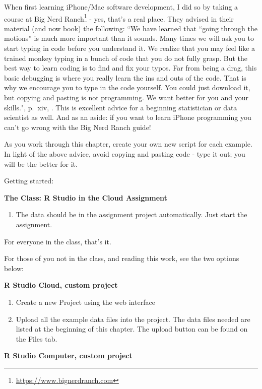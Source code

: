 \documentclass[
]{krantz}
\providecommand{\tightlist}{%
  \setlength{\itemsep}{0pt}\setlength{\parskip}{0pt}}
\renewcommand{\href}[2]{#2\footnote{\url{#1}}}
\begin{document}
When first learning iPhone/Mac software development, I did so by taking a course at \href{https://www.bignerdranch.com}{Big Nerd Ranch} - yes, that's a real place. They advised in their material (and now book) the following: ``We have learned that ``going through the motions'' is much more important than it sounds. Many times we will ask you to start typing in code before you understand it. We realize that you may feel like a trained monkey typing in a bunch of code that you do not fully grasp. But the best way to learn coding is to find and fix your typos. Far from being a drag, this basic debugging is where you really learn the ins and outs of the code. That is why we encourage you to type in the code yourself. You could just download it, but copying and pasting is not programming. We want better for you and your skills.", p.~xiv, \citep{keur2020}. This is excellent advice for a beginning statistician or data scientist as well. And as an aside: if you want to learn iPhone programming you can't go wrong with the Big Nerd Ranch guide!

As you work through this chapter, create your own new script for each example. In light of the above advice, avoid copying and pasting code - type it out; you will be the better for it.

Getting started:

\textbf{The Class: R Studio in the Cloud Assignment}

\begin{enumerate}
\def\labelenumi{\arabic{enumi}.}
\tightlist
\item
  The data should be in the assignment project automatically. Just start the assignment.
\end{enumerate}

For everyone in the class, that's it.

For those of you not in the class, and reading this work, see the two options below:

\textbf{R Studio Cloud, custom project}

\begin{enumerate}
\def\labelenumi{\arabic{enumi}.}
\item
  Create a new Project using the web interface
\item
  Upload all the example data files into the project. The data files needed are listed at the beginning of this chapter. The upload button can be found on the Files tab.
\end{enumerate}

\textbf{R Studio Computer, custom project}
\end{document}
